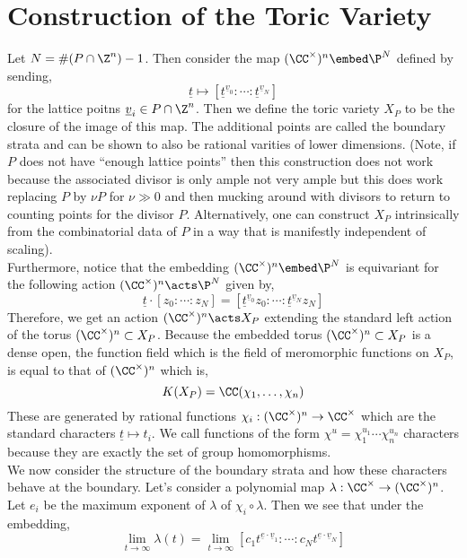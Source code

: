 \documentclass[12pt]{article}
\begin{document}
\section{Construction of the Toric Variety}

Let $N = \# (P \cap \Z^n) - 1$. Then consider the map $(\CC^\times)^n \embed \P^N$ defined by sending,
\[ \underline{t} \mapsto [\underline{t}^{\underline{v}_0} : \cdots : \underline{t}^{\underline{v}_N}] \]
for the lattice poitns $\underline{v}_i \in P \cap \Z^n$. Then we define the toric variety $X_P$ to be the closure of the image of this map. The additional points are called the boundary strata and can be shown to also be rational varities of lower dimensions. (Note, if $P$ does not have ``enough lattice points'' then this construction does not work because the associated divisor is only ample not very ample but this does work replacing $P$ by $\nu P$ for $\nu \gg 0$ and then mucking around with divisors to return to counting points for the divisor $P$. Alternatively, one can construct $X_P$ intrinsically from the combinatorial data of $P$ in a way that is manifestly independent of scaling).
\bigskip\\
Furthermore, notice that the embedding $(\CC^\times)^n \embed \P^N$ is equivariant for the following action $(\CC^\times)^n \acts \P^N$ given by,
\[ \underline{t} \cdot [z_0 : \cdots : z_N] = [\underline{t}^{\underline{v}_0} z_0 : \cdots : \underline{t}^{\underline{v}_N} z_N] \]
Therefore, we get an action $(\CC^\times)^n \acts X_P$ extending the standard left action of the torus $(\CC^\times)^n \subset X_P$. Because the embedded torus $(\CC^\times)^n \subset X_P$ is a dense open, the function field which is the field of meromorphic functions on $X_P$, is equal to that of $(\CC^\times)^n$ which is,
\[ K(X_P) = \CC(\chi_1, \dots, \chi_n) \] 
These are generated by rational functions $\chi_i : (\CC^\times)^n \to \CC^\times$ which are the standard characters $\underline{t} \mapsto t_i$. We call functions of the form $\chi^u = \chi_1^{u_1} \cdots \chi_n^{u_n}$ characters because they are exactly the set of group homomorphisms. 
\bigskip\\
We now consider the structure of the boundary strata and how these characters behave at the boundary. Let's consider a polynomial map $\lambda : \CC^\times \to (\CC^\times)^n$. Let $e_i$ be the maximum exponent of $\lambda$ of $\chi_i \circ \lambda$. Then we see that under the embedding,
\[ \lim_{t \to \infty} \lambda(t) = \lim_{t \to \infty} [c_1 t^{\underline{e} \cdot \underline{v}_1} : \cdots : c_N t^{\underline{e} \cdot \underline{v}_N}] \]
\end{document}
